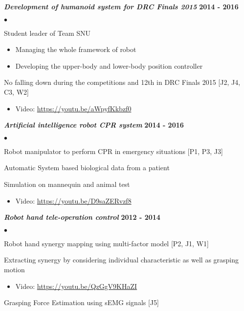 \documentclass[margin,line]{res}
\newenvironment{list2}{
  \begin{list}{$\bullet$}{%
      \setlength{\itemsep}{0in}
      \setlength{\parsep}{0in} \setlength{\parskip}{0in}
      \setlength{\topsep}{0in} \setlength{\partopsep}{0in} 
      \setlength{\leftmargin}{0.2in}}}{\end{list}}
\begin{document}
\begin{resume}
\textbf{\emph { Development of humanoid system for DRC Finals 2015}} \hfill {\bf 2014  - 2016}
\begin{list2}
\item {Student leader} of Team SNU 
\begin{itemize}
\vspace*{-.05in}
\item[\checkmark] Managing the whole framework of robot
\vspace*{-.05in}
\item[\checkmark] Developing the upper-body and lower-body position controller
\vspace*{-.05in}
\end{itemize}
\item No falling down during the competitions and 12th in DRC Finals 2015 [J2, J4, C3, W2]
\begin{itemize}
\vspace*{-.05in}
\item[\checkmark] Video: \url{https://youtu.be/aWpyfKkbzf0}
\vspace*{-.05in}
\end{itemize}
\end{list2}

\textbf{\emph { Artificial intelligence robot CPR system}} \hfill {\bf 2014  - 2016}
\begin{list2}
\item Robot manipulator to perform CPR in emergency situations [P1, P3, J3]
\item Automatic System based biological data from a patient
\item Simulation on mannequin and animal test
\begin{itemize}
\vspace*{-.05in}
\item[\checkmark] Video: \url{https://youtu.be/D9saZERvzf8}
\vspace*{-.05in}
\end{itemize}
\end{list2}

\textbf{\emph { Robot hand tele-operation control}} \hfill {\bf 2012  - 2014}
\begin{list2}
\item Robot hand synergy mapping using multi-factor model [P2, J1, W1]
\item Extracting synergy by considering individual characteristic as well as grasping motion
\begin{itemize}
\vspace*{-.05in}
\item[\checkmark] Video: \url{https://youtu.be/QzGgV9KHaZI}
\vspace*{-.05in}
\end{itemize}
\item Grasping Force Estimation using sEMG signals [J5]
\end{list2}


\end{resume}
\end{document}
